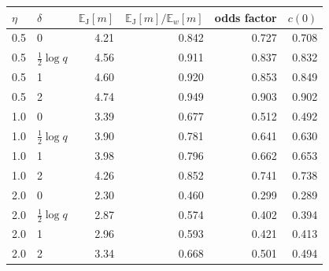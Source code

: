 \begin{tabular}{llrrrr}
\toprule
$\eta$ & $\delta$ & $\mathbb{E}_{\mathrm{J}}[m]$ & $\mathbb{E}_{\mathrm{J}}[m]/\mathbb{E}_{w}[m]$ & odds factor & $c(0)$ \\
\midrule
0.5 & 0 & 4.21 & 0.842 & 0.727 & 0.708 \\
0.5 & $\tfrac12\log q$ & 4.56 & 0.911 & 0.837 & 0.832 \\
0.5 & 1 & 4.60 & 0.920 & 0.853 & 0.849 \\
0.5 & 2 & 4.74 & 0.949 & 0.903 & 0.902 \\
1.0 & 0 & 3.39 & 0.677 & 0.512 & 0.492 \\
1.0 & $\tfrac12\log q$ & 3.90 & 0.781 & 0.641 & 0.630 \\
1.0 & 1 & 3.98 & 0.796 & 0.662 & 0.653 \\
1.0 & 2 & 4.26 & 0.852 & 0.741 & 0.738 \\
2.0 & 0 & 2.30 & 0.460 & 0.299 & 0.289 \\
2.0 & $\tfrac12\log q$ & 2.87 & 0.574 & 0.402 & 0.394 \\
2.0 & 1 & 2.96 & 0.593 & 0.421 & 0.413 \\
2.0 & 2 & 3.34 & 0.668 & 0.501 & 0.494 \\
\bottomrule
\end{tabular}
